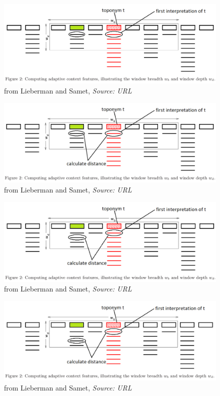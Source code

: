 \documentclass{beamer}
\begin{document}
{\begin{overprint}
		\begin{figure}
			\includegraphics[width=\textwidth]{adaptive-proximity-c.png} 
			\caption{from Lieberman and Samet, \textit{Source: URL}}
		\end{figure}
		
		\begin{figure}
			\includegraphics[width=\textwidth]{adaptive-proximity-d.png} 
			\caption{from Lieberman and Samet, \textit{Source: URL}}
		\end{figure}
		
		\begin{figure}
			\includegraphics[width=\textwidth]{adaptive-proximity-e.png} 
			\caption{from Lieberman and Samet, \textit{Source: URL}}
		\end{figure}
		
		\begin{figure}
			\includegraphics[width=\textwidth]{adaptive-proximity-f.png} 
			\caption{from Lieberman and Samet, \textit{Source: URL}}
		\end{figure}
		

\end{overprint}}
\end{document}
